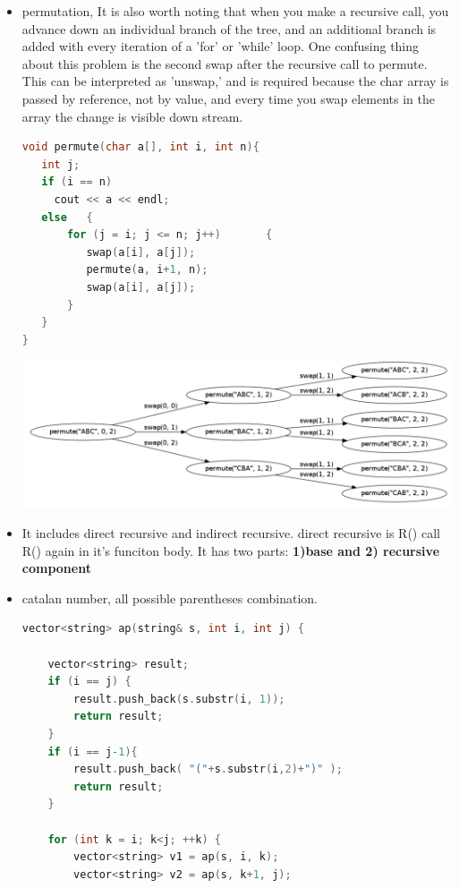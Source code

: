 \documentclass[a4paper,11pt,twoside]{book}
\begin{document}
\begin{itemize}
\begin{enumerate}
\end{enumerate}

\item permutation, It is also worth noting that when you make a recursive call, you advance down an individual branch of the tree, and an additional branch is added with every iteration of a 'for' or 'while' loop. One confusing thing about this problem is the second swap after the recursive call to permute. This can be interpreted as 'unswap,' and is required because the char array is passed by reference, not by value, and every time you swap elements in the array the change is visible down stream.

\begin{lstlisting}[frame=single, language=c++]
void permute(char a[], int i, int n){
   int j;
   if (i == n)
     cout << a << endl;
   else   {
       for (j = i; j <= n; j++)       {
          swap(a[i], a[j]);          
          permute(a, i+1, n);
          swap(a[i], a[j]);
       }
   }
} 
\end{lstlisting}

\includegraphics[scale=0.25]{pics/permutation.png}

\item It includes direct recursive and indirect recursive. direct recursive is R() call R() again in it's funciton body. It has two parts: \textbf{1)base and 2) recursive component}



\item catalan number, all possible parentheses combination. 
\begin{lstlisting}[frame=single, language=c++]
vector<string> ap(string& s, int i, int j) {
	
	vector<string> result;
	if (i == j) {
		result.push_back(s.substr(i, 1));
		return result;
	}
	if (i == j-1){
		result.push_back( "("+s.substr(i,2)+")" );
		return result;
	}
	
	for (int k = i; k<j; ++k) {
		vector<string> v1 = ap(s, i, k);
		vector<string> v2 = ap(s, k+1, j);
		

\end{lstlisting}
\end{itemize}
\end{document}
